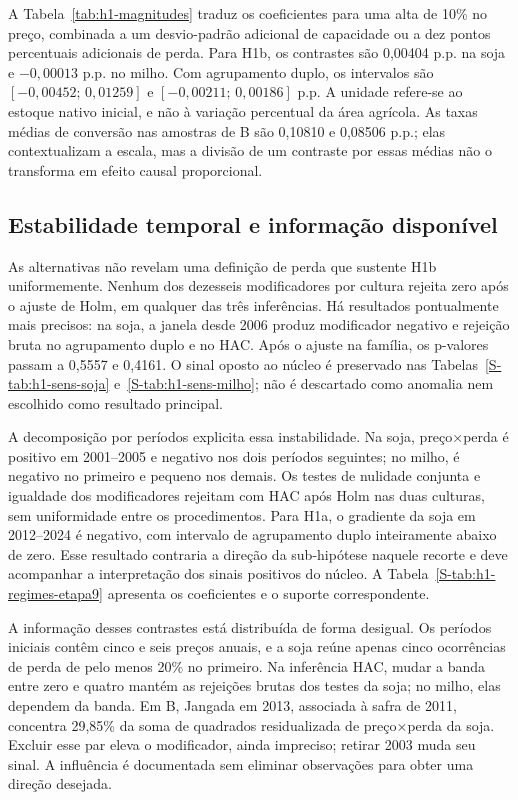 
\FloatBarrier

A Tabela~\ref{tab:h1-magnitudes} traduz os coeficientes para uma alta de 10\% no preço, combinada a um desvio-padrão adicional de capacidade ou a dez pontos percentuais adicionais de perda. Para H1b, os contrastes são 0,00404 p.p. na soja e $-0,00013$ p.p. no milho. Com agrupamento duplo, os intervalos são $[-0,00452;\,0,01259]$ e $[-0,00211;\,0,00186]$ p.p. A unidade refere-se ao estoque nativo inicial, e não à variação percentual da área agrícola. As taxas médias de conversão nas amostras de B são 0,10810 e 0,08506 p.p.; elas contextualizam a escala, mas a divisão de um contraste por essas médias não o transforma em efeito causal proporcional.

\subsection{Estabilidade temporal e informação disponível}

As alternativas não revelam uma definição de perda que sustente H1b uniformemente. Nenhum dos dezesseis modificadores por cultura rejeita zero após o ajuste de Holm, em qualquer das três inferências. Há resultados pontualmente mais precisos: na soja, a janela desde 2006 produz modificador negativo e rejeição bruta no agrupamento duplo e no HAC. Após o ajuste na família, os p-valores passam a 0,5557 e 0,4161. O sinal oposto ao núcleo é preservado nas Tabelas~\ref{S-tab:h1-sens-soja} e~\ref{S-tab:h1-sens-milho}; não é descartado como anomalia nem escolhido como resultado principal.

A decomposição por períodos explicita essa instabilidade. Na soja, preço×perda é positivo em 2001--2005 e negativo nos dois períodos seguintes; no milho, é negativo no primeiro e pequeno nos demais. Os testes de nulidade conjunta e igualdade dos modificadores rejeitam com HAC após Holm nas duas culturas, sem uniformidade entre os procedimentos. Para H1a, o gradiente da soja em 2012--2024 é negativo, com intervalo de agrupamento duplo inteiramente abaixo de zero. Esse resultado contraria a direção da sub-hipótese naquele recorte e deve acompanhar a interpretação dos sinais positivos do núcleo. A Tabela~\ref{S-tab:h1-regimes-etapa9} apresenta os coeficientes e o suporte correspondente.

A informação desses contrastes está distribuída de forma desigual. Os períodos iniciais contêm cinco e seis preços anuais, e a soja reúne apenas cinco ocorrências de perda de pelo menos 20\% no primeiro. Na inferência HAC, mudar a banda entre zero e quatro mantém as rejeições brutas dos testes da soja; no milho, elas dependem da banda. Em B, Jangada em 2013, associada à safra de 2011, concentra 29,85\% da soma de quadrados residualizada de preço×perda da soja. Excluir esse par eleva o modificador, ainda impreciso; retirar 2003 muda seu sinal. A influência é documentada sem eliminar observações para obter uma direção desejada.

